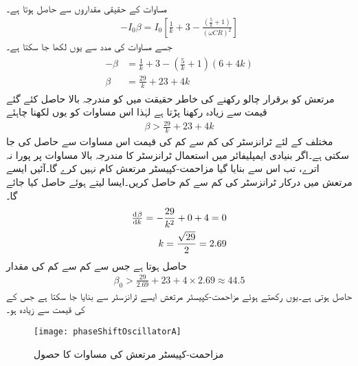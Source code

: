 مساوات  کے حقیقی مقداروں سے حاصل ہوتا ہے۔
\begin{align*}
-I_0 \beta = I_0 \left[\frac{1}{k}+3-\frac{\left(\frac{5}{k}+1 \right)}{\left(\omega C R \right)^2} \right]
\end{align*}
جسے مساوات  کی مدد سے یوں لکھا جا سکتا ہے۔
\begin{gather}
\begin{aligned}\label{مساوات_مرتعش_مزاحمت_کپیسٹر_درکار_افزائش}
-\beta &= \frac{1}{k}+3-\left(\frac{5}{k}+1 \right) \left(6+4 k \right) \\
\beta &=\frac{29}{k}+23+4 k
\end{aligned}
\end{gather}
مرتعش کو برقرار چالو رکھنے کی خاطر حقیقت میں  کو مندرجہ بالا حاصل کئے گئے قیمت سے زیادہ رکھنا پڑتا ہے لہٰذا اس مساوات کو یوں لکھنا چاہئے
\begin{align}
\beta > \frac{29}{k}+23+4 k
\end{align}
مختلف  کے لئے ٹرانزسٹر کی کم سے کم  کی قیمت اس مساوات سے حاصل کی جا سکتی ہے۔اگر بنیادی ایمپلیفائر میں استعمال ٹرانزسٹر کا  مندرجہ بالا مساوات پر پورا نہ اترے، تب اس سے  بنایا گیا مزاحمت-کپیسٹر مرتعش کام نہیں کرے گا۔آئیں ایسے مرتعش میں درکار ٹرانزسٹر کی کم سے کم  حاصل کریں۔ایسا  لیتے ہوئے حاصل کیا جائے گا۔
 \begin{align*}
\od{\beta}{k} = - \frac{29}{k^2}+0 +4 =\num{0}\\
k=\frac{\sqrt{29}}{2}=\num{2.69}
\end{align*}
حاصل ہوتا ہے جس سے کم سے کم  کی مقدار
\begin{align*}
\beta_0 > \frac{29}{2.69}+23+4 \times 2.69 \approx \num{44.5}
\end{align*}
حاصل ہوتی ہے۔یوں  رکھتے ہوئے مزاحمت-کپیسٹر مرتعش ایسے ٹرانزسٹر سے بنایا جا سکتا ہے جس کے  کی قیمت  سے زیادہ ہو۔
\begin{figure}
\centering
\texttt{[image: phaseShiftOscillatorA]}
\caption{مزاحمت-کپیسٹر مرتعش کی مساوات کا حصول}
\label{شکل_مزاحمت_کپیسٹر_مرتعش_الف}
\end{figure}

